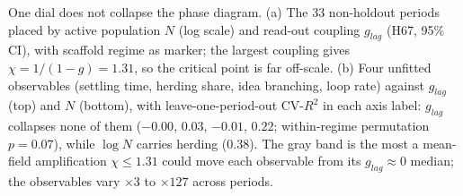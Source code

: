 \caption{One dial does not collapse the phase diagram. (a) The 33 non-holdout periods placed by active population $N$ (log scale) and read-out coupling $g_{lag}$ (H67, 95\% CI), with scaffold regime as marker; the largest coupling gives $\chi=1/(1-g)=1.31$, so the critical point is far off-scale. (b) Four unfitted observables (settling time, herding share, idea branching, loop rate) against $g_{lag}$ (top) and $N$ (bottom), with leave-one-period-out CV-$R^2$ in each axis label: $g_{lag}$ collapses none of them ($-0.00$, $0.03$, $-0.01$, $0.22$; within-regime permutation $p=0.07$), while $\log N$ carries herding (0.38). The gray band is the most a mean-field amplification $\chi\le1.31$ could move each observable from its $g_{lag}\approx0$ median; the observables vary $\times3$ to $\times127$ across periods.}
\label{fig:H51}
